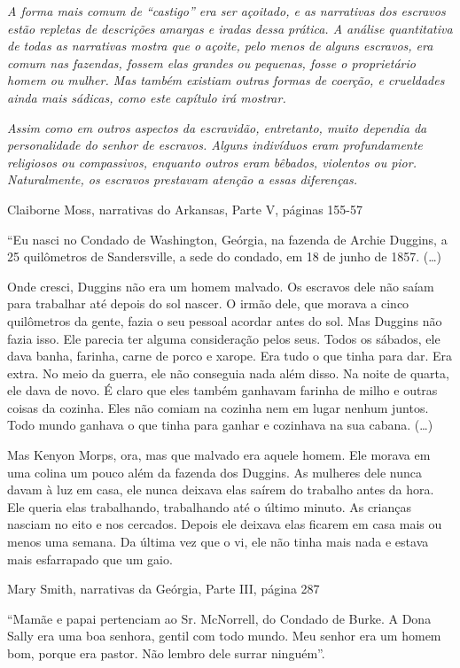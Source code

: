 \emph{A forma mais comum de ``castigo'' era ser açoitado, e as
narrativas dos escravos estão repletas de descrições amargas e iradas
dessa prática. A análise quantitativa de todas as narrativas mostra que
o açoite, pelo menos de alguns escravos, era comum nas fazendas, fossem
elas grandes ou pequenas, fosse o proprietário homem ou mulher. Mas
também existiam outras formas de coerção, e crueldades ainda mais
sádicas, como este capítulo irá mostrar.}

\emph{Assim como em outros aspectos da escravidão, entretanto, muito
dependia da personalidade do senhor de escravos. Alguns indivíduos eram
profundamente religiosos ou compassivos, enquanto outros eram bêbados,
violentos ou pior. Naturalmente, os escravos prestavam atenção a essas
diferenças.}

Claiborne Moss, narrativas do Arkansas, Parte V, páginas 155-57

``Eu nasci no Condado de Washington, Geórgia, na fazenda de Archie
Duggins, a 25 quilômetros de Sandersville, a sede do condado, em 18 de
junho de 1857. (\ldots{})

Onde cresci, Duggins não era um homem malvado. Os escravos dele não
saíam para trabalhar até depois do sol nascer. O irmão dele, que morava
a cinco quilômetros da gente, fazia o seu pessoal acordar antes do sol.
Mas Duggins não fazia isso. Ele parecia ter alguma consideração pelos
seus. Todos os sábados, ele dava banha, farinha, carne de porco e
xarope. Era tudo o que tinha para dar. Era extra. No meio da guerra, ele
não conseguia nada além disso. Na noite de quarta, ele dava de novo. É
claro que eles também ganhavam farinha de milho e outras coisas da
cozinha. Eles não comiam na cozinha nem em lugar nenhum juntos. Todo
mundo ganhava o que tinha para ganhar e cozinhava na sua cabana.
(\ldots{})

Mas Kenyon Morps, ora, mas que malvado era aquele homem. Ele morava em
uma colina um pouco além da fazenda dos Duggins. As mulheres dele nunca
davam à luz em casa, ele nunca deixava elas saírem do trabalho antes da
hora. Ele queria elas trabalhando, trabalhando até o último minuto. As
crianças nasciam no eito e nos cercados. Depois ele deixava elas ficarem
em casa mais ou menos uma semana. Da última vez que o vi, ele não tinha
mais nada e estava mais esfarrapado que um gaio.

Mary Smith, narrativas da Geórgia, Parte III, página 287

``Mamãe e papai pertenciam ao Sr. McNorrell, do Condado de Burke. A Dona
Sally era uma boa senhora, gentil com todo mundo. Meu senhor era um
homem bom, porque era pastor. Não lembro dele surrar ninguém''.

